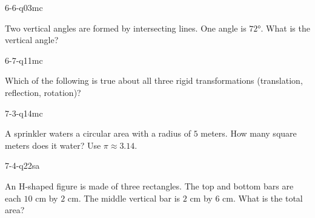 \begin{practiceQuestion}{6-6-q03}{mc}
\begin{questionText}
Two vertical angles are formed by intersecting lines. One angle is $72°$. What is the vertical angle?
\end{questionText}
\end{practiceQuestion}

\begin{practiceQuestion}{6-7-q11}{mc}
\begin{questionText}
Which of the following is true about all three rigid transformations (translation, reflection, rotation)?
\end{questionText}
\end{practiceQuestion}

\begin{practiceQuestion}{7-3-q14}{mc}
\begin{questionText}
A sprinkler waters a circular area with a radius of $5$ meters. How many square meters does it water? Use $\pi \approx 3.14$.
\end{questionText}
\end{practiceQuestion}

\begin{practiceQuestion}{7-4-q22}{sa}
\begin{questionText}
An H-shaped figure is made of three rectangles. The top and bottom bars are each $10$ cm by $2$ cm. The middle vertical bar is $2$ cm by $6$ cm. What is the total area?
\end{questionText}
\end{practiceQuestion}

